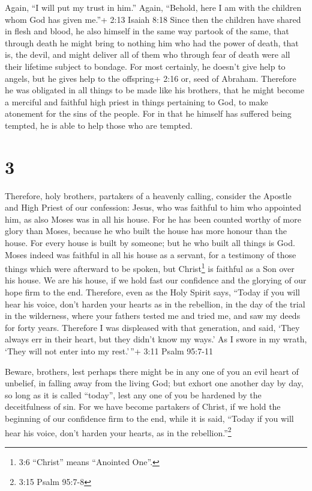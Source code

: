  Again, ``I will put my trust in him.'' Again, ``Behold,
here I am with the children whom God has given me.''+ 2:13 Isaiah 8:18
 Since then the children have shared in flesh and blood, he
also himself in the same way partook of the same, that through death he
might bring to nothing him who had the power of death, that is, the
devil,  and might deliver all of them who through fear of
death were all their lifetime subject to bondage.  For most
certainly, he doesn't give help to angels, but he gives help to the
offspring+ 2:16 or, seed of Abraham.  Therefore he was
obligated in all things to be made like his brothers, that he might
become a merciful and faithful high priest in things pertaining to God,
to make atonement for the sins of the people.  For in that
he himself has suffered being tempted, he is able to help those who are
tempted.

\hypertarget{section-2}{%
\section{3}\label{section-2}}

 Therefore, holy brothers, partakers of a heavenly calling,
consider the Apostle and High Priest of our confession: Jesus,
 who was faithful to him who appointed him, as also Moses
was in all his house.  For he has been counted worthy of
more glory than Moses, because he who built the house has more honour
than the house.  For every house is built by someone; but he
who built all things is God.  Moses indeed was faithful in
all his house as a servant, for a testimony of those things which were
afterward to be spoken,  but Christ\footnote{3:6 ``Christ''
  means ``Anointed One''.} is faithful as a Son over his house. We are
his house, if we hold fast our confidence and the glorying of our hope
firm to the end.  Therefore, even as the Holy Spirit says,
``Today if you will hear his voice,  don't harden your
hearts as in the rebellion, in the day of the trial in the wilderness,
 where your fathers tested me and tried me, and saw my deeds
for forty years.  Therefore I was displeased with that
generation, and said, `They always err in their heart, but they didn't
know my ways.'  As I swore in my wrath, `They will not
enter into my rest.'\,''+ 3:11 Psalm 95:7-11

 Beware, brothers, lest perhaps there might be in any one
of you an evil heart of unbelief, in falling away from the living God;
 but exhort one another day by day, so long as it is called
``today'', lest any one of you be hardened by the deceitfulness of sin.
 For we have become partakers of Christ, if we hold the
beginning of our confidence firm to the end,  while it is
said, ``Today if you will hear his voice, don't harden your hearts, as
in the rebellion.''\footnote{3:15 Psalm 95:7-8}

